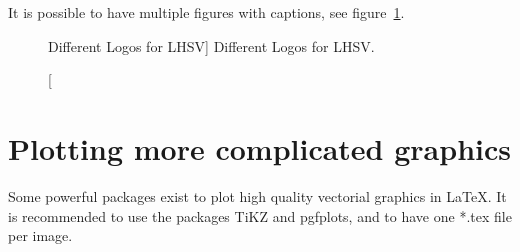 It is possible to have multiple figures with captions, see
figure~\ref{fig:ExampleMultipleImages}.

\begin{figure}[H]%
\begin{center}
%
\hfil
%
%
\hfil
%
%
\hfil
\mbox{}
\end{center}
\caption
[Different Logos for LHSV]
{Different Logos for LHSV.}
\label{fig:ExampleMultipleImages}
\end{figure}

\section{Plotting more complicated graphics}

Some powerful packages exist to plot high quality vectorial graphics in LaTeX.
It is recommended to use the packages TiKZ and pgfplots, and to have one *.tex
file per image.
